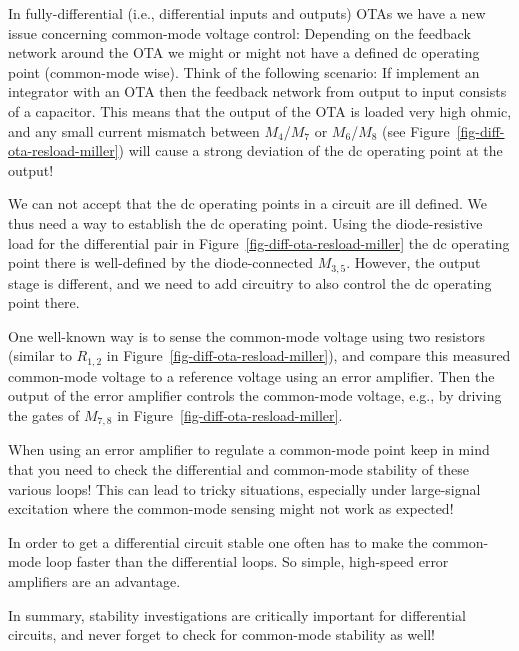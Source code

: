 \documentclass[
  a4paper,
  DIV=11,
  numbers=noendperiod]{scrartcl}
\begin{document}
In fully-differential (i.e., differential inputs and outputs) OTAs we
have a new issue concerning common-mode voltage control: Depending on
the feedback network around the OTA we might or might not have a defined
dc operating point (common-mode wise). Think of the following scenario:
If implement an integrator with an OTA then the feedback network from
output to input consists of a capacitor. This means that the output of
the OTA is loaded very high ohmic, and any small current mismatch
between \(M_4\)/\(M_7\) or \(M_6\)/\(M_8\) (see
Figure~\ref{fig-diff-ota-resload-miller}) will cause a strong deviation
of the dc operating point at the output!

We can not accept that the dc operating points in a circuit are ill
defined. We thus need a way to establish the dc operating point. Using
the diode-resistive load for the differential pair in
Figure~\ref{fig-diff-ota-resload-miller} the dc operating point there is
well-defined by the diode-connected \(M_{3,5}\). However, the output
stage is different, and we need to add circuitry to also control the dc
operating point there.

One well-known way is to sense the common-mode voltage using two
resistors (similar to \(R_{1,2}\) in
Figure~\ref{fig-diff-ota-resload-miller}), and compare this measured
common-mode voltage to a reference voltage using an error amplifier.
Then the output of the error amplifier controls the common-mode voltage,
e.g., by driving the gates of \(M_{7,8}\) in
Figure~\ref{fig-diff-ota-resload-miller}.

\begin{tcolorbox}[enhanced jigsaw, colframe=quarto-callout-important-color-frame, opacityback=0, title=\textcolor{quarto-callout-important-color}{\faExclamation}\hspace{0.5em}{Differential and Common-Mode Loops}, bottomtitle=1mm, breakable, toprule=.15mm, colbacktitle=quarto-callout-important-color!10!white, rightrule=.15mm, arc=.35mm, toptitle=1mm, coltitle=black, bottomrule=.15mm, leftrule=.75mm, titlerule=0mm, colback=white, opacitybacktitle=0.6, left=2mm]

When using an error amplifier to regulate a common-mode point keep in
mind that you need to check the differential and common-mode stability
of these various loops! This can lead to tricky situations, especially
under large-signal excitation where the common-mode sensing might not
work as expected!

In order to get a differential circuit stable one often has to make the
common-mode loop faster than the differential loops. So simple,
high-speed error amplifiers are an advantage.

In summary, stability investigations are critically important for
differential circuits, and never forget to check for common-mode
stability as well!

\end{tcolorbox}
\end{document}

